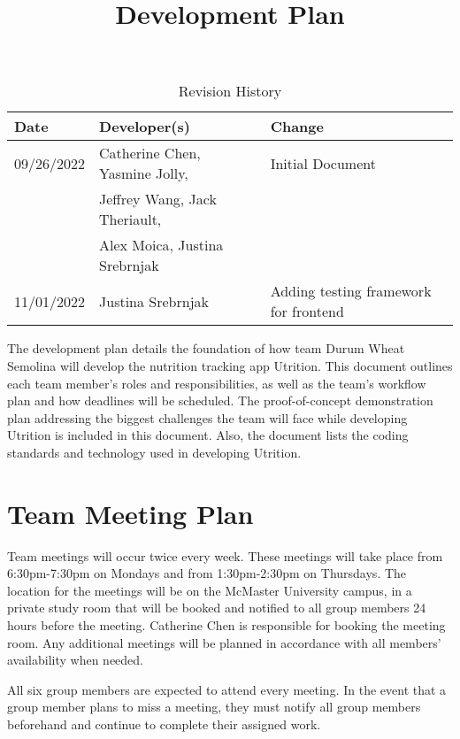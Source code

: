 \documentclass{article}
\title{Development Plan\\\progname}
\author{\authname}
\date{}
\begin{document}
\maketitle

\begin{table}[hp]
\caption{Revision History} \label{TblRevisionHistory}
\begin{tabularx}{\textwidth}{llX}
\toprule
\textbf{Date} & \textbf{Developer(s)} & \textbf{Change}\\
\midrule
09/26/2022 & Catherine Chen, Yasmine Jolly, &Initial Document\\ 
&Jeffrey Wang, Jack Theriault, &\\
&Alex Moica, Justina Srebrnjak &\\
11/01/2022 & Justina Srebrnjak &Adding testing framework for frontend\\ 
\bottomrule
\end{tabularx}
\end{table}

\newpage

The development plan details the foundation of how team Durum Wheat Semolina will develop the nutrition tracking app Utrition. This document outlines each team member’s roles and responsibilities, as well as the team’s workflow plan and how deadlines will be scheduled. The proof-of-concept demonstration plan addressing the biggest challenges the team will face while developing Utrition is included in this document. Also, the document lists the coding standards and technology used in developing Utrition.

\section{Team Meeting Plan}

Team meetings will occur twice every week. These meetings will take place from 6:30pm-7:30pm on Mondays and from 1:30pm-2:30pm on Thursdays. The location for the meetings will be on the McMaster University campus, in a private study room that will be booked and notified to all group members 24 hours before the meeting. Catherine Chen is responsible for booking the meeting room. Any additional meetings will be planned in accordance with all members'  availability when needed.

All six group members are expected to attend every meeting. In the event that a group member plans to miss a meeting, they must notify all group members beforehand and continue to complete their assigned work.
\end{document}
